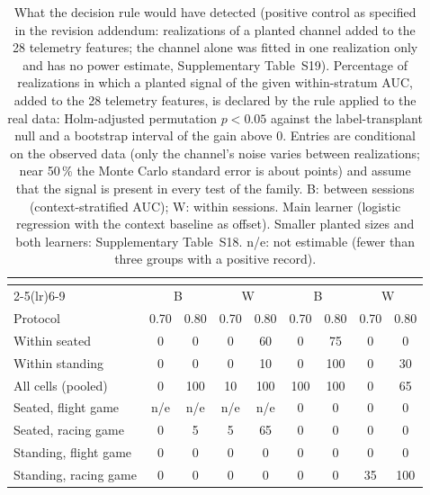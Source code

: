 \begin{table}[t]
\centering
\footnotesize
\caption{What the decision rule would have detected (positive control as specified in the revision addendum:  realizations of a planted channel added to the 28 telemetry features; the channel alone was fitted in one realization only and has no power estimate, Supplementary Table~S19). Percentage of realizations in which a planted signal of the given within-stratum AUC, added to the 28 telemetry features, is declared by the rule applied to the real data: Holm-adjusted permutation $p<0.05$ against the label-transplant null and a bootstrap interval of the gain above 0. Entries are conditional on the observed data (only the channel's noise varies between realizations; near 50\,\% the Monte Carlo standard error is about  points) and assume that the signal is present in every test of the family. B: between sessions (context-stratified AUC); W: within sessions. Main learner (logistic regression with the context baseline as offset). Smaller planted sizes and both learners: Supplementary Table~S18. n/e: not estimable (fewer than three groups with a positive record).}
\label{tab:mde}
\setlength{\tabcolsep}{2.2pt}
\begin{tabular}{@{}lcccccccc@{}}
\toprule
 & \multicolumn{4}{c}{\sevtwo{}} & \multicolumn{4}{c}{\sevone{}} \\
\cmidrule(lr){2-5}\cmidrule(lr){6-9}
 & \multicolumn{2}{c}{B} & \multicolumn{2}{c}{W} & \multicolumn{2}{c}{B} & \multicolumn{2}{c}{W} \\
Protocol & 0.70 & 0.80 & 0.70 & 0.80 & 0.70 & 0.80 & 0.70 & 0.80 \\
\midrule
Within seated & 0 & 0 & 0 & 60 & 0 & 75 & 0 & 0 \\
Within standing & 0 & 0 & 0 & 10 & 0 & 100 & 0 & 30 \\
All cells (pooled) & 0 & 100 & 10 & 100 & 100 & 100 & 0 & 65 \\
Seated, flight game & n/e & n/e & n/e & n/e & 0 & 0 & 0 & 0 \\
Seated, racing game & 0 & 5 & 5 & 65 & 0 & 0 & 0 & 0 \\
Standing, flight game & 0 & 0 & 0 & 0 & 0 & 0 & 0 & 0 \\
Standing, racing game & 0 & 0 & 0 & 0 & 0 & 0 & 35 & 100 \\
\bottomrule
\end{tabular}
\end{table}